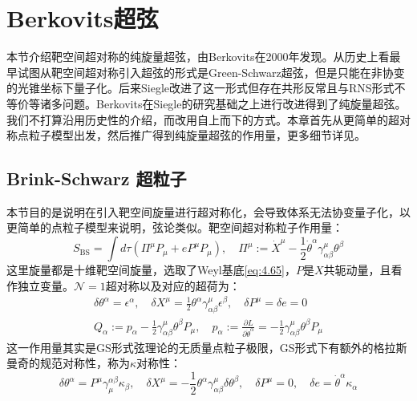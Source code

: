 \chapter{Berkovits超弦}
本节介绍靶空间超对称的纯旋量超弦，由Berkovits在2000年发现\cite{Berkovits:2000fe}。从历史上看最早试图从靶空间超对称引入超弦的形式是Green-Schwarz超弦\cite{Green:1983wt,Green:1983sg}，但是只能在非协变的光锥坐标下量子化。后来Siegle改进了这一形式但存在共形反常且与RNS形式不等价等诸多问题\cite{Siegel:1985xj}。Berkovits在Siegle的研究基础之上进行改进得到了纯旋量超弦。我们不打算沿用历史性的介绍\cite{Berkovits:2002zk,Mafra:2008gkx}，而改用自上而下的方式。本章首先从更简单的超对称点粒子模型出发，然后推广得到纯旋量超弦的作用量，更多细节详见\cite{Berkovits:2017ldz,Mafra:2022wml}。

\section{Brink-Schwarz 超粒子}
本节目的是说明在引入靶空间旋量进行超对称化，会导致体系无法协变量子化，以更简单的点粒子模型来说明，弦论类似。靶空间超对称粒子作用量：\cite{Brink:1981nb,Ferber:1977qx}
\begin{equation}
	\label{eq:5.1}
	S_{\text{BS}}=\int d\tau\left(\Pi^\mu P_\mu+eP^\mu P_\mu\right),\quad\Pi^\mu:=\dot{X}^\mu-\frac{1}{2}\dot{\theta}^\alpha\gamma_{\alpha\beta}^\mu\theta^\beta
\end{equation}
这里旋量都是十维靶空间旋量，选取了Weyl基底\ref{eq:4.65}，$P$是$X$共轭动量，且看作独立变量。$\mathcal{N}=1$超对称以及对应的超荷为：
\begin{equation}
	\label{eq:5.2}
	\begin{gathered}
		\delta\theta^\alpha=\epsilon^\alpha,\quad\delta X^\mu=\frac{1}{2}\theta^\alpha\gamma_{\alpha\beta}^\mu\epsilon^\beta,\quad\delta P^\mu=\delta e=0\\
		Q_\alpha:=p_\alpha-\frac{1}{2}\gamma_{\alpha\beta}^\mu\theta^\beta P_\mu,\quad p_\alpha:=\frac{\partial L}{\partial\dot{\theta}^\alpha}=-\frac{1}{2}\gamma_{\alpha\beta}^\mu\theta^\beta P_\mu
	\end{gathered}
\end{equation}
这一作用量其实是GS形式弦理论的无质量点粒子极限，GS形式下有额外的格拉斯曼奇的规范对称性，称为$\kappa$对称性：
\begin{equation}
	\delta\theta^\alpha=P^\mu\gamma_\mu^{\alpha\beta}\kappa_\beta,\quad\delta X^\mu=-\frac{1}{2}\theta^\alpha\gamma_{\alpha\beta}^\mu\delta\theta^\beta,\quad\delta P^\mu=0,\quad\delta e=\dot{\theta}^\alpha\kappa_\alpha
\end{equation}
